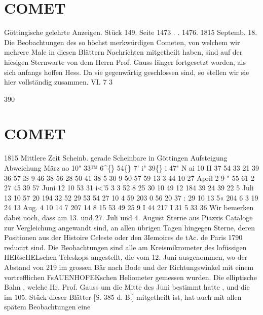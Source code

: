 \documentclass[12pt,a4paper]{article}
\newcommand{\degree}{\textdegree}
\begin{document}
\section*{COMET}
Göttingische  gelehrte  Anzeigen.     Stück  149.  Seite  1473  . .  1476.     1815  Septemb.  18. 
Die  Beobachtungen  des  so  höchst  merkwürdigen  Cometen,  von  welchem  wir  mehrere  Male  in 
diesen  Blättern  Nachrichten  mitgetheilt  haben,  sind  auf  der  hiesigen  Sternwarte  von  dem  Herrn  Prof. 
Gauss  länger  fortgesetzt  worden,  als  sich  anfangs  hoffen  Hess.  Da  sie  gegenwärtig  geschlossen  sind,  so 
stellen  wir  sie  hier  vollständig  zusammen. 
VI.  7  3 


\newpage
390 

\section*{COMET}
1815 
Mittlere Zeit Scheinb.  gerade 
Scheinbare 
in  Göttingen 
Aufsteigung 
Abweichung 
März   ao 
10"  33™ 
6\textasciicircum\{\} 
54\degree\{\}     7'      i" 
39\degree\{\}     i    47"  N 
ai 
10     II 
37 
54     33     21 
39     36     57 
iS 
9     46 
38 
56     28     50 
41     38       5 
30 
9     50 
57 
59     13       3 
44     10     27 
April     2 
9     " 
55 
61       2     27 
45     39     57 
Juni     12 
10     53 
31 
i<'5       3       3 
52       8     25 
30 
10     49 
12 
184     39     24 
39     22      5 
Juli      13 
10     57 
20 
194     32     52 
29     53     54 
27 
10       4 
59 
203       0     56 
20     37      : 
29 
10     13 
5« 
204       6       3 
19     24     13 
Aug.      4 
10     14 
7 
207     14       8 
15     53     49 
25 
9       I 
44 
217       I     31 
5     33     36 
Wir  bemerken  dabei  noch,  dass  am  13.  und  27.  Juli  und  4.  August  Sterne  aus  Piazzis  Cataloge 
zur  Vergleichung  angewandt  sind,  an  allen  übrigen  Tagen  hingegen  Sterne,  deren  Positionen  aus  der 
Histoire  Celeste  oder  den  3Iemoires  de  tAc.  de  Paris  1790  reducirt  sind.  Die  Beobachtungen  sind  alle 
am  Kreismikrometer  des  lofüssigen  HERscHELschen  Teleskops  angestellt,  die  vom  12.  Juni  ausgenommen, 
wo  der  Abstand  von  219  im  grossen  Bär  nach  Bode  und  der  Richtungswinkel  mit  einem  vortrefflichen 
FsAUENHOFEKschen  Heliometer  gemessen  wurden. 
Die  elliptische  Bahn ,  welche  Hr.  Prof.  Gauss  um  die  Mitte  des  Juni  bestimmt  hatte ,  und  die  im 
105.  Stück  dieser  Blätter  [S.  385  d.  B.]  mitgetheilt  ist,  hat  auch  mit  allen  spätem  Beobachtungen  eine 
\end{document}
